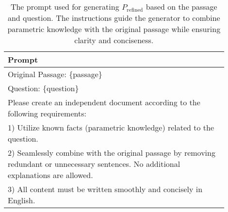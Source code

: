 \begin{table*}[ht]
\centering
\renewcommand{\arraystretch}{1.3}
\setlength{\tabcolsep}{6pt}
\begin{tabular}{p{0.9\linewidth}}
\toprule
\textbf{Prompt} \\
\midrule
Original Passage: \{passage\} \\[1ex]
Question: \{question\} \\[1ex]
Please create an independent document according to the following requirements: \\[1ex]
1) Utilize known facts (parametric knowledge) related to the question. \\[1ex]
2) Seamlessly combine with the original passage by removing redundant or unnecessary sentences. No additional explanations are allowed. \\[1ex]
3) All content must be written smoothly and concisely in English. \\
\bottomrule

\end{tabular}
\caption{The prompt used for generating $P_\text{refined}$ based on the passage and question. The instructions guide the generator to combine parametric knowledge with the original passage while ensuring clarity and conciseness.}
\label{tab:prompt_dkm}
\end{table*}

